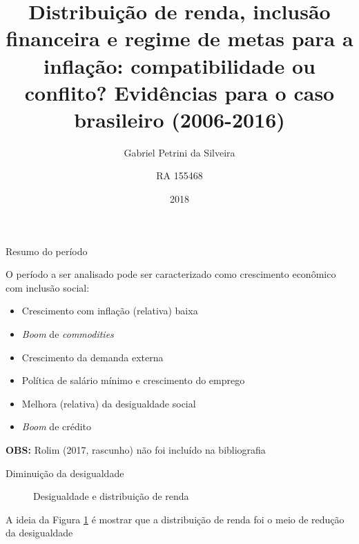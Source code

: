 \documentclass[pdf, xcolor=table]{beamer}
\author{Gabriel Petrini da Silveira \and RA 155468}
\title[Projeto]{Distribuição de renda, inclusão financeira e regime de metas para a inflação: compatibilidade ou conflito? Evidências para o caso brasileiro (2006-2016)}
\institute{Instituto de Economia - UNICAMP}
\date{2018}
\begin{document}
\begin{frame}
\titlepage
\end{frame}

\begin{frame}{Resumo do período}

    O período a ser analisado pode ser caracterizado como \alert{crescimento econômico com inclusão social}:
    \begin{itemize}
        \item Crescimento com inflação (relativa) baixa
        \item \textit{Boom} de \textit{commodities}
        \item Crescimento da demanda externa
        \item Política de salário mínimo e crescimento do emprego
        \item Melhora (relativa) da desigualdade social
        \item \textit{Boom} de crédito
    \end{itemize}
\textbf{OBS:} Rolim (2017, rascunho) não foi incluído na bibliografia
\end{frame}



\begin{frame}{Diminuição da desigualdade}
    \begin{figure}[H]
    \caption{Desigualdade e distribuição de renda}
    \label{fig}
	\usetikzlibrary{arrows.meta,chains}

\end{figure}
A ideia da Figura \ref{fig} é mostrar que a distribuição de renda foi o meio de redução da desigualdade
\end{frame}
\end{document}

